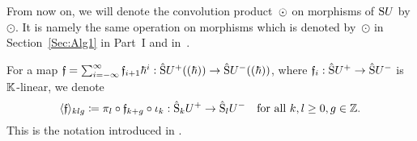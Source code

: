 \documentclass[\MainFolder/Text.tex]{subfiles}
\begin{document}
\begin{Notation}[Replacing $\Star$ with $\odot$ for $V=\Sym U$]
From now on, we will denote the convolution product~$\Star$ on morphisms of $\mathrm{S} U$ by $\odot$. It is namely the same operation on morphisms which is denoted by~$\odot$ in Section~\ref{Sec:Alg1} in Part~I and in~\cite{Cieliebak2015}.
\end{Notation}
\renewcommand{\Star}{\odot}
For a map $\mathfrak{f} = \sum_{i=-\infty}^\infty \mathfrak{f}_{i+1}\hbar^i: \hat{\mathrm{S}}U^+((\hbar)) \rightarrow \hat{\mathrm{S}}U^-((\hbar))$, where $\mathfrak{f}_{i}: \hat{\mathrm{S}}U^+\rightarrow\hat{\mathrm{S}}U^-$ is $\mathbb{K}$-linear, we denote 
\[ \langle \mathfrak{f}\rangle_{klg} \coloneqq \pi_l \circ \mathfrak{f}_{k+g}\circ \iota_k: \hat{\mathrm{S}}_k U^+ \rightarrow \hat{\mathrm{S}}_l U^-\quad\text{for all }k, l\ge 0, g\in \mathbb{Z}. \]
This is the notation introduced in \cite[Equation~(2.14)]{Cieliebak2015}.
\end{document}
